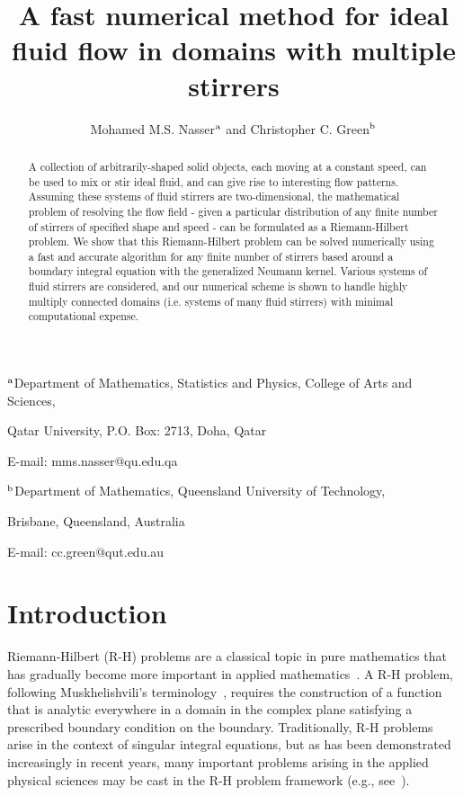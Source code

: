 \documentclass[11pt,a4paper]{article}
\begin{document}
\title{A fast numerical method for ideal fluid flow in domains with multiple stirrers}

\author{Mohamed M.S. Nasser$^{\rm a}$ and Christopher C. Green$^{\rm b}$}

\date{}
\maketitle

\vskip-0.8cm %
\centerline{$^{\rm a}$Department of Mathematics, Statistics and Physics, College of Arts and Sciences,} %
\centerline{Qatar University, P.O. Box: 2713, Doha, Qatar}%
\centerline{E-mail: mms.nasser@qu.edu.qa}

\centerline{$^{\rm b}$Department of Mathematics, Queensland University of Technology,} %
\centerline{Brisbane, Queensland, Australia}%
\centerline{E-mail: cc.green@qut.edu.au}

\begin{abstract}
A collection of arbitrarily-shaped solid objects, each moving at a
constant speed, can be used to mix or stir ideal fluid, and can give
rise to interesting flow patterns. Assuming these systems of fluid
stirrers are two-dimensional, the mathematical problem of resolving
the flow field - given a particular distribution of any finite number
of stirrers of specified shape and speed - can be formulated as a
Riemann-Hilbert problem. We show that this Riemann-Hilbert problem can
be solved numerically using a fast and accurate algorithm for any
finite number of stirrers based around a boundary integral equation
with the generalized Neumann kernel. Various systems of fluid stirrers
are considered, and our numerical scheme is shown to handle highly
multiply connected domains (i.e. systems of many fluid stirrers) with
minimal computational expense.
\end{abstract}

\section{Introduction}
\label{sc:int}

Riemann-Hilbert (R-H) problems are a classical topic in pure mathematics
that has gradually become more important in applied mathematics~\cite{Abl03,Mus}. 
A R-H problem, following Muskhelishvili's terminology~\cite{Mus},
requires the construction of a function that is analytic everywhere in
a domain in the complex plane satisfying a prescribed boundary
condition on the boundary. Traditionally, R-H problems
arise in the context of singular integral equations, but as has been demonstrated increasingly in recent years, many important problems arising in the applied physical sciences may be cast in the R-H problem framework (e.g., see~\cite{cro-str,skpf,Gak66,Mus,NAS-ETNA15,nas-lap,nas-cr,wegm}). 
\end{document}
